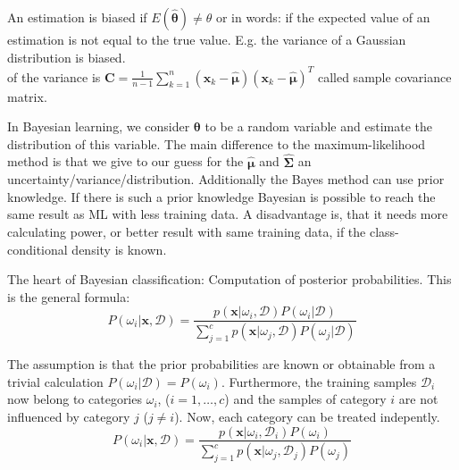   An estimation is biased if $E(\boldsymbol{\hat{\theta}}) \neq \theta$ or in words: if the expected 
  value of an estimation is not equal to the true value.
  E.g. the variance of a Gaussian distribution is biased.\\
   of the variance is $\boldsymbol{C} = \frac1{n-1} \sum\limits_{k=1}^n 
  (\boldsymbol{x}_k - \boldsymbol{\hat{\mu}})(\boldsymbol{x}_k - \boldsymbol{\hat{\mu}})^T$ called sample covariance matrix.
  
  
  In Bayesian learning, we consider $\boldsymbol{\theta}$ to be a random variable and estimate the distribution of this variable.
  The main difference to the maximum-likelihood method is that we give to our guess for the $\boldsymbol{\hat{\mu}}$ and $\boldsymbol{\hat{\Sigma}}$ an 
   uncertainty\slash{}variance\slash{}distribution. Additionally the Bayes method can use prior knowledge. If there is such a prior knowledge Bayesian is possible 
   to reach the same result as ML with less training data. A disadvantage is, that it needs more calculating power, or better result with same training data, if the class-conditional density is known.
  
  The heart of Bayesian classification: Computation of posterior probabilities. This is the 
  general formula:
  $$P(\omega_i|\bm{x}, \mathcal{D}) = \frac{p(\bm{x}|\omega_i, \mathcal{D}) P(\omega_i|\mathcal{D})}
    {\sum\limits_{j=1}^{c} p(\bm{x}|\omega_j, \mathcal{D}) P(\omega_j|\mathcal{D})}$$
    
    
  The assumption is that the prior probabilities are known or obtainable from a trivial calculation $P(\omega_i|\mathcal{D})=P(\omega_i)$.
  Furthermore, the training samples $\mathcal{D}_i$ now belong to categories $\omega_i$, 
  ($i=1,\ldots,c$) and the samples of category $i$ are not influenced by category $j$ ($j \neq i$).
  Now, each category can be treated indepently.
  $$P(\omega_i|\bm{x}, \mathcal{D}) = \frac{p(\bm{x}|\omega_i, \mathcal{D}_i) P(\omega_i)}
    {\sum\limits_{j=1}^{c} p(\bm{x}|\omega_j, \mathcal{D}_j) P(\omega_j)}$$
    
